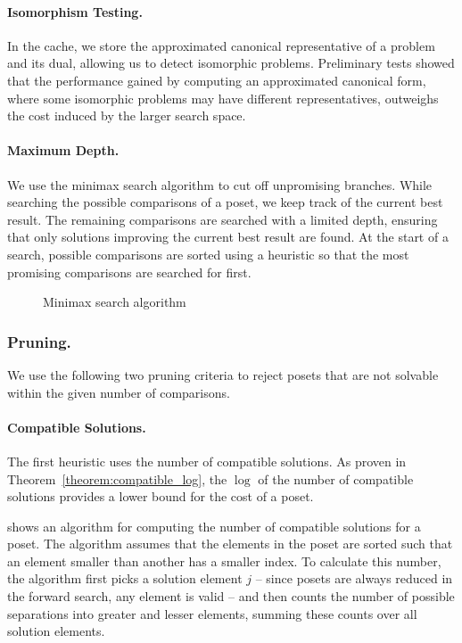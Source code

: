 \documentclass[twoside,leqno,twocolumn]{article}
\begin{document}
\paragraph{Isomorphism Testing.}
In the cache, we store the approximated canonical representative of a problem and its dual, allowing us to detect isomorphic problems.
Preliminary tests showed that the performance gained by computing an approximated canonical form, where some isomorphic problems may have different representatives, outweighs the cost induced by the larger search space.

\paragraph{Maximum Depth.}
We use the minimax search algorithm to cut off unpromising branches.
While searching the possible comparisons of a poset, we keep track of the current best result.
The remaining comparisons are searched with a limited depth, ensuring that only solutions improving the current best result are found.
At the start of a search, possible comparisons are sorted using a heuristic so that the most promising comparisons are searched for first.

\begin{figure}[!b]
  \centering
  
  \caption{Minimax search algorithm}
  \label{fig:minimax_search}
\end{figure}

\subsubsection{Pruning.}
We use the following two pruning criteria to reject posets that are not solvable within the given number of comparisons.

\paragraph{Compatible Solutions.}
The first heuristic uses the number of compatible solutions.
As proven in Theorem~\ref{theorem:compatible_log}, the $\log$ of the number of compatible solutions provides a lower bound for the cost of a poset.

 shows an algorithm for computing the number of compatible solutions for a poset.
The algorithm assumes that the elements in the poset are sorted such that an element smaller than another has a smaller index.
To calculate this number, the algorithm first picks a solution element $j$ -- since posets are always reduced in the forward search, any element is valid -- and then counts the number of possible separations into greater and lesser elements, summing these counts over all solution elements.
\end{document}
